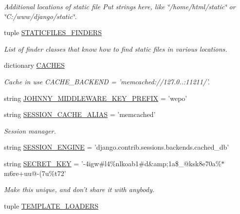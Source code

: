 \begin{DoxyCompactItemize}
\begin{DoxyCompactList}\small\item\em Additional locations of static file Put strings here, like \char`\"{}/home/html/static\char`\"{} or \char`\"{}\-C\-:/www/django/static\char`\"{}. \end{DoxyCompactList}\item 
tuple \hyperlink{namespacewepo_1_1settings_adba3f172a0e5080586dc8a88f1918290}{S\-T\-A\-T\-I\-C\-F\-I\-L\-E\-S\-\_\-\-F\-I\-N\-D\-E\-R\-S}
\begin{DoxyCompactList}\small\item\em List of finder classes that know how to find static files in various locations. \end{DoxyCompactList}\item 
dictionary \hyperlink{namespacewepo_1_1settings_a153ec0e290d7467e4de29f825a3dbe81}{C\-A\-C\-H\-E\-S}
\begin{DoxyCompactList}\small\item\em Cache in use C\-A\-C\-H\-E\-\_\-\-B\-A\-C\-K\-E\-N\-D = 'memcached\-://127.0..\-:11211/'. \end{DoxyCompactList}\item 
string \hyperlink{namespacewepo_1_1settings_a7c38ded18bd50ffa02f5cb2d6f3e2cee}{J\-O\-H\-N\-N\-Y\-\_\-\-M\-I\-D\-D\-L\-E\-W\-A\-R\-E\-\_\-\-K\-E\-Y\-\_\-\-P\-R\-E\-F\-I\-X} = 'wepo'
\item 
string \hyperlink{namespacewepo_1_1settings_aff76d22872cecda4226a3ae6fe520bbd}{S\-E\-S\-S\-I\-O\-N\-\_\-\-C\-A\-C\-H\-E\-\_\-\-A\-L\-I\-A\-S} = 'memcached'
\begin{DoxyCompactList}\small\item\em Session manager. \end{DoxyCompactList}\item 
string \hyperlink{namespacewepo_1_1settings_a6072380d2a207c0a2973b979bffd01e9}{S\-E\-S\-S\-I\-O\-N\-\_\-\-E\-N\-G\-I\-N\-E} = 'django.\-contrib.\-sessions.\-backends.\-cached\-\_\-db'
\item 
string \hyperlink{namespacewepo_1_1settings_a461b9adbf4543b4d1b51c833cd0612d3}{S\-E\-C\-R\-E\-T\-\_\-\-K\-E\-Y} = '-\/4igw\#l4\%nlkoab1\#d\&amp;1a\$\-\_\-@ksk8e70a\%$\ast$m6re+uu@-\/(7u\%t72'
\begin{DoxyCompactList}\small\item\em Make this unique, and don't share it with anybody. \end{DoxyCompactList}\item 
tuple \hyperlink{namespacewepo_1_1settings_a9077964357f8bc248cd25fd1565c681d}{T\-E\-M\-P\-L\-A\-T\-E\-\_\-\-L\-O\-A\-D\-E\-R\-S}

\end{DoxyCompactItemize}

